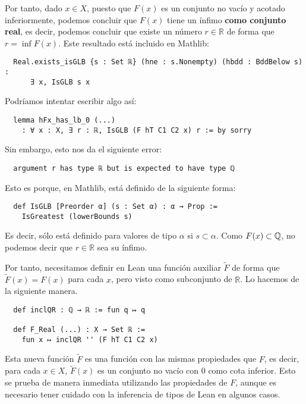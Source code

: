Por tanto, dado $x \in X$, puesto que $F(x)$ es un conjunto no vacío y acotado inferiormente, podemos concluir que $F(x)$ tiene un ínfimo \textbf{como conjunto real}, es decir, podemos concluir que existe un número $r \in \mathbb{R}$ de forma que $r = \inf F(x)$. Este resultado está incluido en Mathlib:

\begin{lstlisting}
  Real.exists_isGLB {s : Set ℝ} (hne : s.Nonempty) (hbdd : BddBelow s) :
      ∃ x, IsGLB s x
\end{lstlisting}

Podríamos intentar escribir algo así:

\begin{lstlisting}
  lemma hFx_has_lb_0 (...)
    : ∀ x : X, ∃ r : ℝ, IsGLB (F hT C1 C2 x) r := by sorry
\end{lstlisting}

Sin embargo, esto nos da el siguiente error:

\begin{lstlisting}
  argument r has type ℝ but is expected to have type ℚ
\end{lstlisting}

Esto es porque, en Mathlib,  está definido de la siguiente forma:

\begin{lstlisting}
  def IsGLB [Preorder α] (s : Set α) : α → Prop :=
    IsGreatest (lowerBounds s)
\end{lstlisting}

Es decir, sólo está definido para valores de tipo $\alpha$ si $s \subset \alpha$. Como $F(x) \subset \mathbb{Q}$, no podemos decir que $r \in \mathbb{R}$ sea su ínfimo.

Por tanto, necesitamos definir en Lean una función auxiliar $\tilde{F}$ de forma que $\tilde{F}(x) = F(x)$ para cada $x$, pero visto como subconjunto de $\mathbb{R}$. Lo hacemos de la siguiente manera.

\begin{lstlisting}
  def inclQR : ℚ → ℝ := fun q ↦ q

  def F_Real (...) : X → Set ℝ :=
    fun x ↦ inclQR '' (F hT C1 C2 x)
\end{lstlisting}

Esta nueva función $\tilde{F}$ es una función con las mismas propiedades que $F$, es decir, para cada $x \in X$, $\tilde{F}(x)$ es un conjunto no vacío con $0$ como cota inferior. Esto se prueba de manera inmediata utilizando las propiedades de $F$, aunque es necesario tener cuidado con la inferencia de tipos de Lean en algunos casos.

